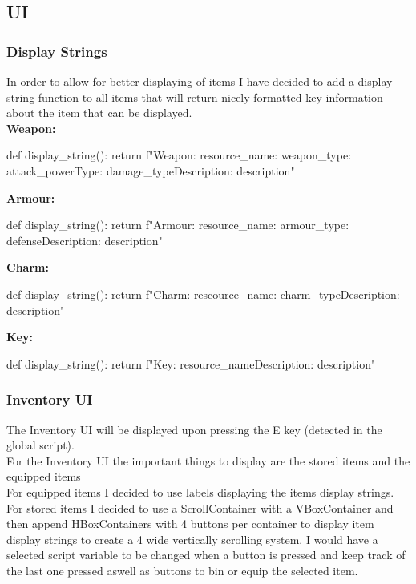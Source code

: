 \documentclass{article}
\begin{document}
        \subsection{UI}
        \subsubsection{Display Strings}
        In order to allow for better displaying of items I have decided to add a display string function to all items that will return nicely formatted key information about the item that can be displayed.\\
        \textbf{Weapon:}\\
        \begin{python}
def display_string():
   return f"Weapon\nName: {resource_name}\nType: {weapon_type}\nDamage: {attack_power}\nDamage Type: {damage_type}\n Description: {description}"
        \end{python}
        \textbf{Armour:}\\
        \begin{python}
def display_string():
   return f"Armour\nName: {resource_name}\nType: {armour_type}\nDefense: {defense}\n Description: {description}"
        \end{python}
        \textbf{Charm:}\\
        \begin{python}
def display_string():
   return f"Charm\nName: {rescource_name}\nType: {charm_type}\n Description: {description}"
        \end{python}
        \textbf{Key:}\\
        \begin{python}
def display_string():
   return f"Key\nName: {resource_name}\n Description: {description}"
        \end{python}
        \subsubsection{Inventory UI}
        The Inventory UI will be displayed upon pressing the E key (detected in the global script).\\
        For the Inventory UI the important things to display are the stored items and the equipped items\\
        For equipped items I decided to use labels displaying the items display strings.\\
        For stored items I decided to use a ScrollContainer with a VBoxContainer and then append HBoxContainers with 4 buttons per container to display item display strings to create a 4 wide vertically scrolling system. I would have a selected script variable to be changed when a button is pressed and keep track of the last one pressed aswell as buttons to bin or equip the selected item.\\
\end{document}
